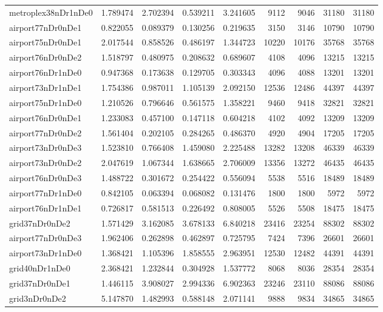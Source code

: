 \begin{longtable}{|l|r|r|r|r|r|r|r|r|}
metroplex38nDr1nDe0 & 1.789474 & 2.702394 & 0.539211 & 3.241605 & 9112 & 9046 & 31180 & 31180 \\
airport77nDr0nDe1 & 0.822055 & 0.089379 & 0.130256 & 0.219635 & 3150 & 3146 & 10790 & 10790 \\
airport75nDr0nDe1 & 2.017544 & 0.858526 & 0.486197 & 1.344723 & 10220 & 10176 & 35768 & 35768 \\
airport76nDr0nDe2 & 1.518797 & 0.480975 & 0.208632 & 0.689607 & 4108 & 4096 & 13215 & 13215 \\
airport76nDr1nDe0 & 0.947368 & 0.173638 & 0.129705 & 0.303343 & 4096 & 4088 & 13201 & 13201 \\
airport73nDr1nDe1 & 1.754386 & 0.987011 & 1.105139 & 2.092150 & 12536 & 12486 & 44397 & 44397 \\
airport75nDr1nDe0 & 1.210526 & 0.796646 & 0.561575 & 1.358221 & 9460 & 9418 & 32821 & 32821 \\
airport76nDr0nDe1 & 1.233083 & 0.457100 & 0.147118 & 0.604218 & 4102 & 4092 & 13209 & 13209 \\
airport77nDr0nDe2 & 1.561404 & 0.202105 & 0.284265 & 0.486370 & 4920 & 4904 & 17205 & 17205 \\
airport73nDr0nDe3 & 1.523810 & 0.766408 & 1.459080 & 2.225488 & 13282 & 13208 & 46339 & 46339 \\
airport73nDr0nDe2 & 2.047619 & 1.067344 & 1.638665 & 2.706009 & 13356 & 13272 & 46435 & 46435 \\
airport76nDr0nDe3 & 1.488722 & 0.301672 & 0.254422 & 0.556094 & 5538 & 5516 & 18489 & 18489 \\
airport77nDr1nDe0 & 0.842105 & 0.063394 & 0.068082 & 0.131476 & 1800 & 1800 & 5972 & 5972 \\
airport76nDr1nDe1 & 0.726817 & 0.581513 & 0.226492 & 0.808005 & 5526 & 5508 & 18475 & 18475 \\
grid37nDr0nDe2 & 1.571429 & 3.162085 & 3.678133 & 6.840218 & 23416 & 23254 & 88302 & 88302 \\
airport77nDr0nDe3 & 1.962406 & 0.262898 & 0.462897 & 0.725795 & 7424 & 7396 & 26601 & 26601 \\
airport73nDr1nDe0 & 1.368421 & 1.105396 & 1.858555 & 2.963951 & 12530 & 12482 & 44391 & 44391 \\
grid40nDr1nDe0 & 2.368421 & 1.232844 & 0.304928 & 1.537772 & 8068 & 8036 & 28354 & 28354 \\
grid37nDr0nDe1 & 1.446115 & 3.908027 & 2.994336 & 6.902363 & 23246 & 23110 & 88086 & 88086 \\
grid3nDr0nDe2 & 5.147870 & 1.482993 & 0.588148 & 2.071141 & 9888 & 9834 & 34865 & 34865 \\

\end{longtable}
